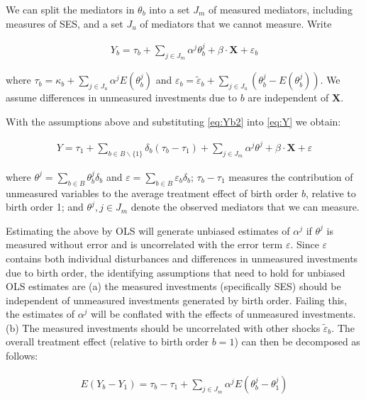 \documentclass[
]{article}
\begin{document}
We can split the mediators in \(\theta_b\) into a set \(J_m\) of measured
mediators, including measures of SES, and a set \(J_u\) of mediators that
we cannot measure. Write

\begin{align}
\label{eq:Yb2}
Y_b = \tau_b + \sum_{j \in J_m} \alpha^j \theta^j_b + \beta \cdot \mathbf{X} + \varepsilon_b
\end{align}

where \(\tau_b = \kappa_b + \sum_{j \in J_u} \alpha^j E(\theta^j_b)\) and
\(\varepsilon_b = \tilde{\varepsilon}_b + \sum_{j \in J_u} (\theta^j_b - E(\theta^j_b))\).
We assume differences in unmeasured investments due to \(b\) are
independent of \(\mathbf{X}\).

With the assumptions above and substituting \eqref{eq:Yb2} into
\eqref{eq:Y} we obtain:

\begin{align}
\label{eq:Ynew}
Y = \tau_1+\sum_{b \in B\backslash\{1\}} \delta_b(\tau_b-\tau_1) + \sum_{j \in J_m} \alpha^j \theta^j  +   \beta \cdot \mathbf{X} + \varepsilon
\end{align}

where \(\theta^j = \sum_{b \in B}\theta^j_b\delta_b\) and
\(\varepsilon = \sum_{b \in B}\varepsilon_b\delta_b\); \(\tau_b-\tau_1\)
measures the contribution of unmeasured variables to the average
treatment effect of birth order \(b\), relative to birth order 1; and
\(\theta^j, j \in J_m\) denote the observed mediators that we can measure.

Estimating the above by OLS will generate unbiased estimates of
\(\alpha^j\) if \(\theta^j\) is measured without error and is uncorrelated
with the error term \(\varepsilon\). Since \(\varepsilon\) contains both
individual disturbances and differences in unmeasured investments due to
birth order, the identifying assumptions that need to hold for unbiased
OLS estimates are (a) the measured investments (specifically SES) should
be independent of unmeasured investments generated by birth order.
Failing this, the estimates of \(\alpha^j\) will be conflated with the
effects of unmeasured investments. (b) The measured investments should
be uncorrelated with other shocks \(\tilde{\varepsilon}_b\). The overall
treatment effect (relative to birth order \(b = 1\)) can then be
decomposed as follows:

\begin{align}
\label{eq:YbY1}
E(Y_b - Y_1) = \tau_b - \tau_1 + \sum_{j \in J_m} \alpha^j E(\theta^j_b - \theta^j_1)
\end{align}
\end{document}

